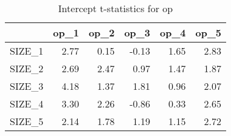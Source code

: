 \begin{table}[ht]
\centering
\caption{Intercept t-statistics for op} 
\begin{tabular}{rrrrrr}
  \hline
 & op\_1 & op\_2 & op\_3 & op\_4 & op\_5 \\ 
  \hline
SIZE\_1 & 2.77 & 0.15 & -0.13 & 1.65 & 2.83 \\ 
  SIZE\_2 & 2.69 & 2.47 & 0.97 & 1.47 & 1.87 \\ 
  SIZE\_3 & 4.18 & 1.37 & 1.81 & 0.96 & 2.07 \\ 
  SIZE\_4 & 3.30 & 2.26 & -0.86 & 0.33 & 2.65 \\ 
  SIZE\_5 & 2.14 & 1.78 & 1.19 & 1.15 & 2.72 \\ 
   \hline
\end{tabular}
\end{table}


